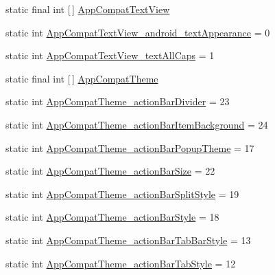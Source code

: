 \begin{DoxyCompactItemize}
\item 
static final int \mbox{[}$\,$\mbox{]} \hyperlink{classandroid_1_1support_1_1v7_1_1appcompat_1_1R_1_1styleable_a87384e67b6e421e7c07536d9afe8d185}{App\+Compat\+Text\+View}
\item 
static int \hyperlink{classandroid_1_1support_1_1v7_1_1appcompat_1_1R_1_1styleable_af764a0698a230cd1f1682eacbc17ddfc}{App\+Compat\+Text\+View\+\_\+android\+\_\+text\+Appearance} = 0
\item 
static int \hyperlink{classandroid_1_1support_1_1v7_1_1appcompat_1_1R_1_1styleable_a991a7f424270ded62fc81772e1855c97}{App\+Compat\+Text\+View\+\_\+text\+All\+Caps} = 1
\item 
static final int \mbox{[}$\,$\mbox{]} \hyperlink{classandroid_1_1support_1_1v7_1_1appcompat_1_1R_1_1styleable_a5c42f89e8a410c323be34208d75c430b}{App\+Compat\+Theme}
\item 
static int \hyperlink{classandroid_1_1support_1_1v7_1_1appcompat_1_1R_1_1styleable_a2d926b280f2f1a0f939bb5cf4a225345}{App\+Compat\+Theme\+\_\+action\+Bar\+Divider} = 23
\item 
static int \hyperlink{classandroid_1_1support_1_1v7_1_1appcompat_1_1R_1_1styleable_a17eecf1a80d73bd2a653d3d4b0c370d3}{App\+Compat\+Theme\+\_\+action\+Bar\+Item\+Background} = 24
\item 
static int \hyperlink{classandroid_1_1support_1_1v7_1_1appcompat_1_1R_1_1styleable_ad1da7806009a3e57f92cf88e4c8ac44a}{App\+Compat\+Theme\+\_\+action\+Bar\+Popup\+Theme} = 17
\item 
static int \hyperlink{classandroid_1_1support_1_1v7_1_1appcompat_1_1R_1_1styleable_a52ac1f860eda81cb2958b695309ae510}{App\+Compat\+Theme\+\_\+action\+Bar\+Size} = 22
\item 
static int \hyperlink{classandroid_1_1support_1_1v7_1_1appcompat_1_1R_1_1styleable_ad74d0d401e28273f585ebe1accd70505}{App\+Compat\+Theme\+\_\+action\+Bar\+Split\+Style} = 19
\item 
static int \hyperlink{classandroid_1_1support_1_1v7_1_1appcompat_1_1R_1_1styleable_aff968b1e543d42c65c91979ff78e7eb9}{App\+Compat\+Theme\+\_\+action\+Bar\+Style} = 18
\item 
static int \hyperlink{classandroid_1_1support_1_1v7_1_1appcompat_1_1R_1_1styleable_ac89b799df31756d7b6caae2096111d8c}{App\+Compat\+Theme\+\_\+action\+Bar\+Tab\+Bar\+Style} = 13
\item 
static int \hyperlink{classandroid_1_1support_1_1v7_1_1appcompat_1_1R_1_1styleable_a2c4b1233d1cce4f6c18fc9982808d74f}{App\+Compat\+Theme\+\_\+action\+Bar\+Tab\+Style} = 12

\end{DoxyCompactItemize}
